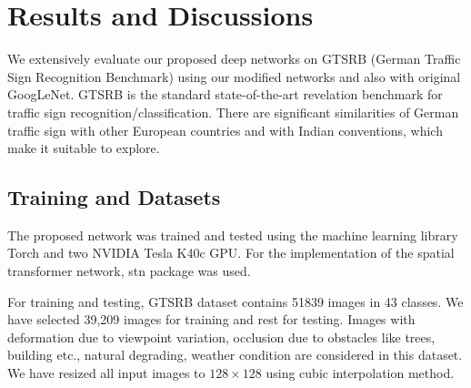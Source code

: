 \documentclass[conference]{IEEEtran}
\begin{document}
\section{Results and Discussions}
We extensively evaluate our proposed deep networks on GTSRB (German Traffic Sign Recognition Benchmark) \cite{gtsrb} using our modified networks and also with original GoogLeNet. GTSRB is the standard state-of-the-art revelation benchmark for traffic sign recognition/classification. There are significant similarities of German traffic sign with other European countries and with Indian conventions, which make it suitable to explore. 
\subsection{Training and Datasets}
The proposed network was trained and tested using the machine learning library Torch \cite{torch} and two NVIDIA Tesla K40c GPU. For the implementation of the spatial transformer network, stn \cite{stnp} package was used.

For training and testing, GTSRB dataset contains 51839 images in 43 classes. We have selected 39,209 images for training and rest for testing. Images with deformation due to viewpoint variation, occlusion due to obstacles like trees, building etc., natural degrading, weather condition are considered in this dataset. We have resized all input images to $ 128 \times 128 $ using cubic interpolation method. 
\end{document}

